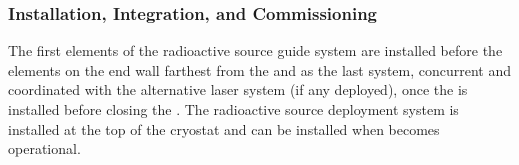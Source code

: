 \subsubsection{Installation, Integration, and Commissioning}
The first elements of the radioactive source guide system are installed before the  elements on the end wall farthest from the  and as the last system, concurrent and coordinated with the alternative laser system (if any deployed), once the  is installed before closing the . The radioactive source deployment system is installed at the top of the cryostat and can be installed when  becomes operational.


